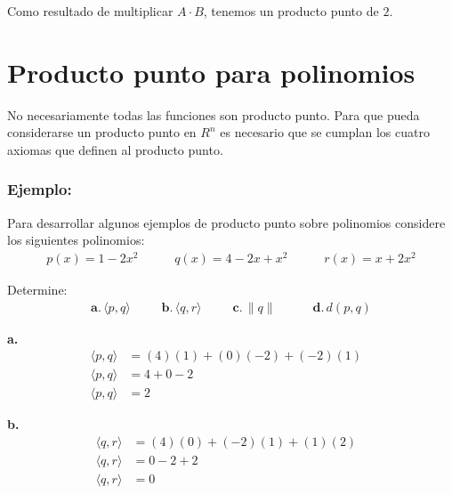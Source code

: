 \documentclass{article}
\begin{document}
    Como resultado de multiplicar $A \cdot B$, tenemos un producto punto de $2$.

\section{Producto punto para polinomios}

   No necesariamente todas las funciones son producto punto. Para que pueda considerarse un producto punto en $R^n$ es necesario que se cumplan los cuatro axiomas que definen al producto punto.

   \subsubsection*{Ejemplo:}

    Para desarrollar algunos ejemplos de producto punto sobre polinomios considere los siguientes polinomios:
    \begin{gather*}
        p(x)=1-2x^{2}\hspace{35pt}q(x)=4-2x+x^{2}\hspace{35pt}r(x)=x+2x^{2}
    \end{gather*}

    Determine:
    \begin{gather*}
        \textbf{a.}\hspace{2pt}\langle p,q\rangle\hspace{30pt}\textbf{b.}\hspace{2pt}\langle q,r\rangle\hspace{30pt}\textbf{c.}\hspace{2pt}\parallel q\parallel\hspace{35pt}\textbf{d.}\hspace{2pt}d(p,q)
    \end{gather*}

    \textbf{a.}
        \begin{align*}
            \langle p,q\rangle&= (4)(1)+(0)(-2)+(-2)(1) & \\
            \langle p,q\rangle&= 4+0-2 & \\
            \langle p,q\rangle&= 2
        \end{align*}

    \textbf{b.}
        \begin{align*}
            \langle q,r\rangle&= (4)(0)+(-2)(1)+(1)(2) & \\
            \langle q,r\rangle&= 0-2+2 & \\
            \langle q,r\rangle&= 0
        \end{align*}
\end{document}
